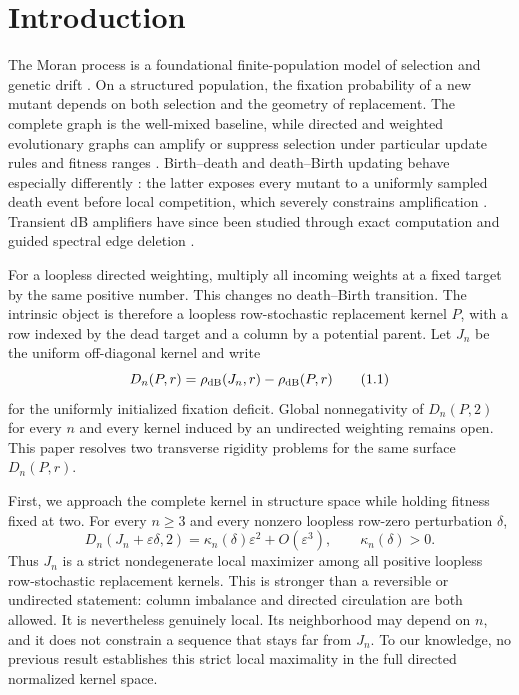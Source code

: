 \section{Introduction}

The Moran process is a foundational finite-population model of selection and
genetic drift \citep{Moran1958}.  On a structured population, the fixation
probability of a new mutant depends on both selection and the geometry of
replacement.  The complete graph is the well-mixed baseline, while directed
and weighted evolutionary graphs can amplify or suppress selection under
particular update rules and fitness ranges
\citep{Lieberman2005,Shakarian2012,Masuda2009,Allen2017,Allen2020}.
Birth--death and death--Birth updating behave especially differently
\citep{Kaveh2015}: the latter exposes every mutant to a uniformly sampled
death event before local competition, which severely constrains
amplification \citep{Hindersin2015,Tkadlec2020}.
Transient dB amplifiers have since been studied through exact computation and
guided spectral edge deletion \citep{Allen2020,Richter2023}.

For a loopless directed weighting, multiply all incoming weights at a fixed
target by the same positive number.  This changes no death--Birth transition.
The intrinsic object is therefore a loopless row-stochastic replacement
kernel $P$, with a row indexed by the dead target and a column by a potential
parent.  Let $J_n$ be the uniform off-diagonal kernel and write
\[
 D_n(P,r)=\rho_{\mathrm{dB}}(J_n,r)-\rho_{\mathrm{dB}}(P,r)                 \tag{1.1}\label{1.1}
\]
for the uniformly initialized fixation deficit.  Global nonnegativity of
$D_n(P,2)$ for every $n$ and every kernel induced by an undirected weighting
remains open.
This paper resolves two transverse rigidity problems for the same surface
$D_n(P,r)$.

First, we approach the complete kernel in structure space while holding
fitness fixed at two.  For every $n\ge3$ and every nonzero loopless
row-zero perturbation $\delta$,
\[
 D_n(J_n+\varepsilon\delta,2)
   =\kappa_n(\delta)\varepsilon^2+O(\varepsilon^3),
 \qquad \kappa_n(\delta)>0.                                \tag{1.2}\label{1.2}
\]
Thus $J_n$ is a strict nondegenerate local maximizer among all positive
loopless row-stochastic replacement kernels.  This is stronger than a
reversible or undirected statement: column imbalance and directed circulation
are both allowed.  It is nevertheless genuinely local.  Its neighborhood
may depend on $n$, and it does not constrain a sequence that stays far from
$J_n$.  To our knowledge, no previous result establishes this strict local
maximality in the full directed normalized kernel space.

